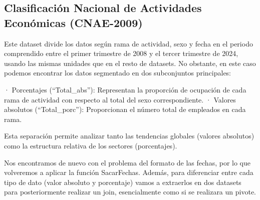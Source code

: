 \documentclass[notspecified,article,submit,moreauthors,pdftex]{Definitions/mdpi}
\begin{document}
\subsection{Clasificación Nacional de Actividades Económicas
(CNAE-2009)}\label{clasificaciuxf3n-nacional-de-actividades-econuxf3micas-cnae-2009}

Este dataset divide los datos según rama de actividad, sexo y fecha en
el periodo comprendido entre el primer trimestre de 2008 y el tercer
trimestre de 2024, usando las mismas unidades que en el resto de
datasets. No obstante, en este caso podemos encontrar los datos
segmentado en dos subconjuntos principales:

· Porcentajes (``Total\_abs''): Representan la proporción de ocupación
de cada rama de actividad con respecto al total del sexo
correspondiente. · Valores absolutos (``Total\_porc''): Proporcionan el
número total de empleados en cada rama.

Esta separación permite analizar tanto las tendencias globales (valores
absolutos) como la estructura relativa de los sectores (porcentajes).

Nos encontramos de nuevo con el problema del formato de las fechas, por
lo que volveremos a aplicar la función SacarFechas. Además, para
diferenciar entre cada tipo de dato (valor absoluto y porcentaje) vamos
a extraerlos en dos datasets para posteriormente realizar un join,
esencialmente como si se realizara un pivote.
\end{document}
